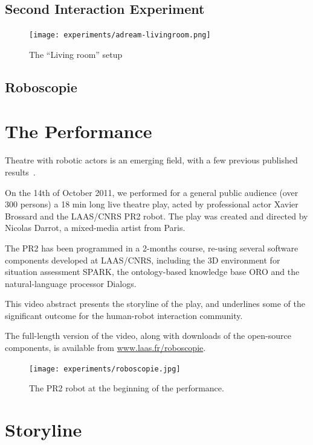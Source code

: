 \subsection{Second Interaction Experiment}
\label{sect|expe2}

\begin{figure}
    \centering
    \texttt{[image: experiments/adream-livingroom.png]}
    \caption{The ``Living room'' setup}
    \label{fig|livingroom}
\end{figure}


\subsection{Roboscopie}
\label{sect|roboscopie}

\section{The Performance}

Theatre with robotic actors is an emerging field, with a few previous published
results~\cite{Breazeal2003, Lin2009, Mavridis2009}.

On the 14th of October 2011, we performed for a general public audience (over
300 persons) a 18 min long live theatre play, acted by professional actor
Xavier Brossard and the LAAS/CNRS PR2 robot. The play was created and directed
by Nicolas Darrot, a mixed-media artist from Paris.

The PR2 has been programmed in a 2-months course, re-using several software
components developed at LAAS/CNRS, including the 3D environment for situation
assessment SPARK, the ontology-based knowledge base ORO and the natural-language
processor {\sc Dialogs}.

This video abstract presents the storyline of the play, and underlines some of
the significant outcome for the human-robot interaction community.

The full-length version of the video, along with downloads of the open-source
components, is available from \url{www.laas.fr/roboscopie}.

\begin{figure}
    \centering
    \texttt{[image: experiments/roboscopie.jpg]}
    \caption{The PR2 robot at the beginning of the performance.}
    \label{fig|pr2-opens-curtains}
\end{figure}


\section{Storyline}

